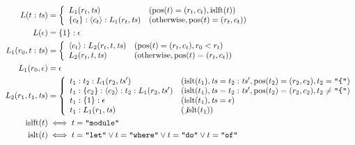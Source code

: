 \documentclass[12pt]{article}
\begin{document}
\pagestyle{empty}

\begin{align*}
    L(t:\mathit{ts}) &= \left\{\begin{array}{ll}
        L_1(r_t, \mathit{ts}) &(\mathrm{pos}(t) = (r_t, c_t), \mathrm{islft}(t)) \\
        \{c_t\}:\langle c_t\rangle:L_1(r_t, \mathit{ts}) &(\text{otherwise}, \mathrm{pos}(t) = (r_t, c_t))
    \end{array}\right. \\
    L(\epsilon) &= \{1\}:\epsilon \\
    L_1(r_0, t:\mathit{ts}) &= \left\{\begin{array}{ll}
        \langle c_t\rangle:L_2(r_t, t, \mathit{ts}) &(\mathrm{pos}(t) = (r_t, c_t), r_0 < r_t) \\
        L_2(r_t, t, \mathit{ts}) &(\text{otherwise}, \mathrm{pos}(t) = (r_t, c_t))
    \end{array}\right. \\
    L_1(r_0, \epsilon) &= \epsilon \\
    L_2(r_1, t_1, \mathit{ts}) &= \left\{\begin{array}{ll}
        t_1:t_2:L_1(r_2, \mathit{ts}') &(\mathrm{islt}(t_1), \mathit{ts} = t_2:\mathit{ts}',\mathrm{pos}(t_2) = (r_2, c_2), t_2 = \texttt{\textquotedbl\{\textquotedbl}) \\
        t_1:\{c_2\}:\langle c_2\rangle:t_2:L_1(r_2, \mathit{ts}') &(\mathrm{islt}(t_1), \mathit{ts} = t_2:\mathit{ts}',\mathrm{pos}(t_2) = (r_2, c_2), t_2 \neq \texttt{\textquotedbl\{\textquotedbl}) \\
        t_1:\{1\}:\epsilon &(\mathrm{islt}(t_1), \mathit{ts} = \epsilon) \\
        t_1:L_1(r_1, \mathit{ts}) &(\not\mathrm{islt}(t_1))
    \end{array}\right. \\
    \mathrm{islft}(t) &\iff t = \texttt{\textquotedbl module\textquotedbl} \\
    \mathrm{islt}(t) &\iff
        t = \texttt{\textquotedbl let\textquotedbl}
        \lor t = \texttt{\textquotedbl where\textquotedbl}
        \lor t = \texttt{\textquotedbl do\textquotedbl}
        \lor t = \texttt{\textquotedbl of\textquotedbl}
\end{align*}
\end{document}
